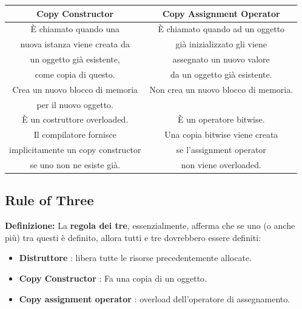 \begin{tabular}{|c|c|}
	\hline
	\textbf{Copy Constructor} & \textbf{Copy Assignment Operator} \\
	\hline
	\textsf{\small È chiamato quando una } & \textsf{\small È chiamato quando ad un oggetto } \\
	\textsf{\small nuova istanza viene creata da } & \textsf{\small già inizializzato gli viene } \\
	\textsf{\small un oggetto già esistente, } & \textsf{\small assegnato un nuovo valore } \\
	\textsf{\small come copia di questo.} & \textsf{\small da un oggetto già esistente.} \\
	\hline
	\textsf{\small Crea un nuovo blocco di memoria} & \textsf{\small Non crea un nuovo blocco di memoria.} \\
	\textsf{\small per il nuovo oggetto.} & \textsf{\small } \\
	\hline
	\textsf{\small È un costruttore overloaded.} & \textsf{\small È un operatore bitwise.} \\
	\hline
	\textsf{\small Il compilatore fornisce} & \textsf{\small Una copia bitwise viene creata} \\
	\textsf{\small implicitamente un copy constructor} & \textsf{\small se l'assignment operator} \\
	\textsf{\small se uno non ne esiste già.} & \textsf{\small non viene overloaded.} \\
	\hline
\end{tabular}

\subsection{Rule of Three}

\textsf{\small \textbf{Definizione: } La \textbf{regola dei tre}, essenzialmente, afferma che se uno (o anche più) tra questi è definito, allora tutti e tre dovrebbero essere definiti: } \\

\begin{itemize}
	\item \textsf{\small \textbf{Distruttore} : libera tutte le risorse precedentemente allocate.}
	\item \textsf{\small \textbf{Copy Constructor} : Fa una copia di un oggetto.}
	\item \textsf{\small \textbf{Copy assignment operator} : overload dell'operatore di assegnamento.}
\end{itemize}


